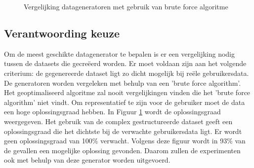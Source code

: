 \documentclass[Main.tex]{subfiles}
\begin{document}
\begin{figure}
\centering
{}
\caption{Vergelijking datageneratoren met gebruik van brute force algoritme} \label{fig:datageneratoren}
\end{figure}

\subsection{Verantwoording keuze}
Om de meest geschikte datagenerator te bepalen is er een vergelijking nodig tussen de datasets die gecre\"eerd worden. Er moet voldaan zijn aan het volgende criterium: de gegenereerde dataset ligt zo dicht mogelijk bij re\"ele gebruikersdata. De generatoren worden vergeleken met behulp van een 'brute force algorithm'. Het geoptimaliseerd algoritme zal nooit vergelijkingen vinden die het 'brute force algorithm' niet vindt. Om representatief te zijn voor de gebruiker moet de data een hoge oplossingsgraad hebben. In Figuur \ref{fig:datageneratoren} wordt de oplossingsgraad weergegeven. Het gebruik van de complex gestructureerde dataset geeft een oplossingsgraad die het dichtste bij de verwachte gebruikersdata ligt. Er wordt geen oplossingsgraad van 100\% verwacht. Volgens deze figuur wordt in 93\% van de gevallen een mogelijke oplossing gevonden. Daarom zullen de experimenten ook met behulp van deze generator worden uitgevoerd.
\end{document}
